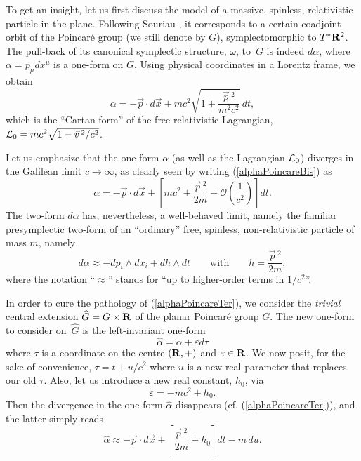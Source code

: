 \documentclass[a4paper,11pt]{article}
\newcommand{\cL}{{\cal L}}
\newcommand{\bR}{{\bf R}}
\newcommand{\vx}{{\vec x}}
\def\vp{{\vec p}}
\def\vv{{\vec v}}
\def\vx{{\vec x}}
\begin{document}
To get an insight, let us first discuss the model of a
massive, spinless, relativistic particle in the plane.
Following Souriau \cite{SSD}, it  corresponds to a certain coadjoint orbit
of the
Poincar\'e group (we still denote by $G$), symplectomorphic to
$T^*\bR^2$. The pull-back of its canonical symplectic structure, $\omega$,
to~$G$ is indeed $d\alpha$, where
$\alpha=p_{\mu}dx^{\mu}$ is a one-form on $G$.
Using physical coordinates in a Lorentz frame, we obtain
\begin{equation}
\alpha=-\vp\cdot d\vx+mc^2\sqrt{1+\frac{\vp{\,}^2}{m^2c^2}}\,dt,
\label{alphaPoincareBis}
\end{equation}
which is the ``Cartan-form'' \cite{SSD} of the free relativistic Lagrangian,
$\cL_{0}=mc^2\sqrt{1-\vv{\,}^2/c^2}$.

\goodbreak

Let us emphasize that the one-form $\alpha$
(as well as the Lagrangian $\cL_{0}$) diverges
in the Galilean limit $c\to\infty$, as clearly seen by writing
(\ref{alphaPoincareBis}) as
\begin{equation}
\alpha
=
-\vp\cdot d\vx
+\left[
mc^2
+
\frac{\vp{\,}^2}{2m}+\mathcal{O}\left(\frac{1}{c^2}\right)
\right]dt.
\label{alphaPoincareTer}
\end{equation}
The two-form $d\alpha$ has,
nevertheless, a well-behaved limit, namely the familiar presymplectic two-form
of an ``ordinary'' free, spinless, non-relativistic particle of mass
$m$, namely
\begin{equation}
d\alpha
\approx
-dp_i\wedge{}dx_i
+
dh\wedge{}dt
\qquad
\mathrm{with}
\qquad
h=\frac{\vp{\,}^2}{2m},
\label{limitdalphaPoincare}
\end{equation}
where the notation ``$\approx$'' stands for ``up to higher-order terms in
$1/c^2$''.

In order to cure the pathology of (\ref{alphaPoincareTer}), we
consider the  {\it trivial} central extension
$\widehat{G}=G\times\bR$ of the planar Poincar\'e
group $G$. The new one-form to consider on~$\widehat{G}$ is the
left-invariant one-form
\begin{equation}
\widehat{\alpha}=\alpha+\varepsilon d\tau
\label{alphahat}
\end{equation}
where $\tau$ is a coordinate on the centre  $(\bR,+)$ and
$\varepsilon\in\bR$.
We now posit, for the sake of convenience,
$
\tau=t+{u}/{c^2}
$
where $u$ is a new real parameter that replaces our old
$\tau$. Also, let us introduce a new real constant, $h_0$,
via
\begin{equation}
\varepsilon=-mc^2+h_0.
\label{intenergydec}
\end{equation}
Then the divergence in the one-form
$\widehat{\alpha}$ disappears (cf. (\ref{alphaPoincareTer})),
and the latter simply reads
\begin{equation}
\widehat{\alpha}
\approx
-\vp\cdot d\vx
+\left[\frac{\vp{\,}^2}{2m}
+h_0\right]dt
-
m\,du.
\label{alphaPoincareQuarto}
\end{equation}
\end{document}
